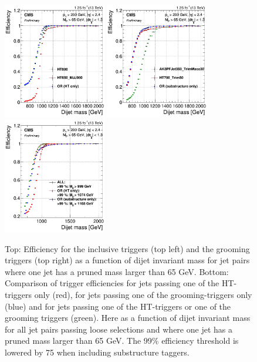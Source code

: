 \begin{figure}[h!]
\centering
\includegraphics[width=0.4\textwidth]{figures/analysis/search1/AN-15-211//triggereffMjj-HT.png}
\includegraphics[width=0.4\textwidth]{figures/analysis/search1/AN-15-211//triggereffMjj-SUBST.png}\\
\includegraphics[width=0.4\textwidth]{figures/analysis/search1/AN-15-211/triggereffMjj-ALL.png}
\caption{Top: Efficiency for the inclusive triggers (top left) and the grooming triggers (top right) as a function of dijet invariant mass for jet pairs where one jet has a pruned mass larger than 65 GeV. Bottom: Comparison of trigger efficiencies for jets passing one of the HT-triggers only (red), for jets passing one of the grooming-triggers only (blue) and for jets passing one of the HT-triggers or one of the grooming triggers (green). Here as a function of dijet invariant mass for all jet pairs passing loose selections and where one jet has a pruned mass larger than 65 GeV. The 99\% efficiency threshold is lowered by 75 \GeV when including substructure taggers.}
\label{fig:searchI:trigger-fits}
\end{figure}
